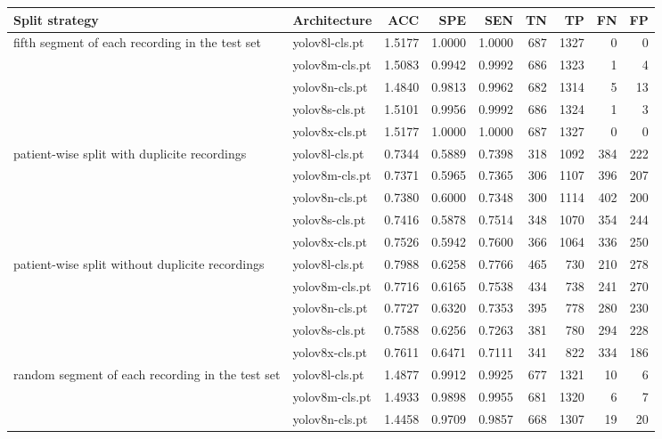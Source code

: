 \begin{table}
    \centering
    \tiny
    \begin{tabular}{llrrrrrrr}
        \toprule
         Split strategy & Architecture & ACC & SPE & SEN & TN & TP & FN & FP \\
        \midrule
            \multirow{5}{10em}{fifth segment of each recording in the test set} & yolov8l-cls.pt & 1.5177 & 1.0000 & 1.0000 & 687 & 1327 & 0 & 0 \\
			 & yolov8m-cls.pt & 1.5083 & 0.9942 & 0.9992 & 686 & 1323 & 1 & 4 \\
			 & yolov8n-cls.pt & 1.4840 & 0.9813 & 0.9962 & 682 & 1314 & 5 & 13 \\
			 & yolov8s-cls.pt & 1.5101 & 0.9956 & 0.9992 & 686 & 1324 & 1 & 3 \\
			 & yolov8x-cls.pt & 1.5177 & 1.0000 & 1.0000 & 687 & 1327 & 0 & 0 \\
			\midrule
			\multirow{5}{10em}{patient-wise split with duplicite recordings} & yolov8l-cls.pt & 0.7344 & 0.5889 & 0.7398 & 318 & 1092 & 384 & 222 \\
			 & yolov8m-cls.pt & 0.7371 & 0.5965 & 0.7365 & 306 & 1107 & 396 & 207 \\
			 & yolov8n-cls.pt & 0.7380 & 0.6000 & 0.7348 & 300 & 1114 & 402 & 200 \\
			 & yolov8s-cls.pt & 0.7416 & 0.5878 & 0.7514 & 348 & 1070 & 354 & 244 \\
			 & yolov8x-cls.pt & 0.7526 & 0.5942 & 0.7600 & 366 & 1064 & 336 & 250 \\
			\midrule
			\multirow{5}{10em}{patient-wise split without duplicite recordings} & yolov8l-cls.pt & 0.7988 & 0.6258 & 0.7766 & 465 & 730 & 210 & 278 \\
			 & yolov8m-cls.pt & 0.7716 & 0.6165 & 0.7538 & 434 & 738 & 241 & 270 \\
			 & yolov8n-cls.pt & 0.7727 & 0.6320 & 0.7353 & 395 & 778 & 280 & 230 \\
			 & yolov8s-cls.pt & 0.7588 & 0.6256 & 0.7263 & 381 & 780 & 294 & 228 \\
			 & yolov8x-cls.pt & 0.7611 & 0.6471 & 0.7111 & 341 & 822 & 334 & 186 \\
			\midrule
			\multirow{5}{10em}{random segment of each recording in the test set} & yolov8l-cls.pt & 1.4877 & 0.9912 & 0.9925 & 677 & 1321 & 10 & 6 \\
			 & yolov8m-cls.pt & 1.4933 & 0.9898 & 0.9955 & 681 & 1320 & 6 & 7 \\
			 & yolov8n-cls.pt & 1.4458 & 0.9709 & 0.9857 & 668 & 1307 & 19 & 20 \\

\end{tabular}
\end{table}
